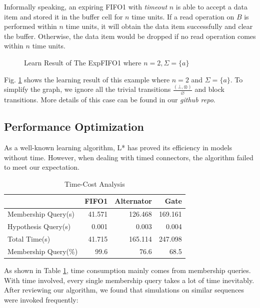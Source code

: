 \documentclass[conference, a4paper]{IEEEtran}
\newcommand{\rnoread}[0]{\otimes}
\newcommand{\rempty}[0]{\varnothing}
\begin{document}
Informally speaking, an expiring FIFO1 with \emph{timeout} $n$ is able to accept a data item
and stored it in the buffer cell for $n$ time units. If a read operation on $B$ is performed within
$n$ time units, it will obtain the data item successfully and clear the buffer. Otherwise, the data
item would be dropped if no read operation comes within $n$ time units.

\begin{figure}[ht]
  \begin{center}
    
  \end{center}
  \caption{Learn Result of The ExpFIFO1 where $n=2,\Sigma=\{a\}$}
  \label{fig:expfifosemantics}
\end{figure}

Fig. \ref{fig:expfifosemantics} shows the learning result of this example where $n=2$ and
$\Sigma=\{a\}$.
To simplify the graph, we ignore all the trivial transitions $\frac{(\bot,\rnoread)}{\rempty}$
and block transitions. More details of this case can be found in our \emph{github repo}.

\subsection{Performance Optimization}
As a well-known learning algorithm, L* has proved its efficiency in models without time.
However, when dealing with timed connectors, the algorithm failed to meet our expectation.

\begin{table}[ht]
  \renewcommand{\arraystretch}{1.3}
  \caption{Time-Cost Analysis}
  \label{tabel:timecost}
  \centering
  \begin{tabular}{l||rrr}
    \hline
    & FIFO1 & Alternator & Gate \\
    \hline\hline
    Membership Query(s) & 41.571 & 126.468 & 169.161 \\
    Hypothesis Query(s) & 0.001 & 0.003 & 0.004 \\
    Total Time(s) & 41.715 & 165.114 & 247.098 \\
    Membership Query(\%) & 99.6 & 76.6 & 68.5 \\
    \hline
  \end{tabular}
\end{table}

As shown in Table \ref{tabel:timecost}, time consumption mainly comes from membership queries.
With time involved, every single membership query takes a lot of time inevitably.
After reviewing our algorithm, we found that simulations on similar sequences were invoked frequently:
\end{document}
